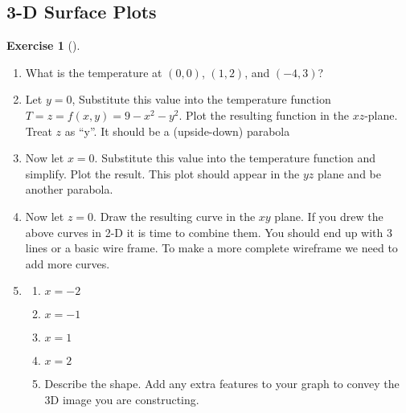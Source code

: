 \documentclass[10pt,]{book}
\theoremstyle{plain}
\theoremstyle{definition}
\theoremstyle{definition}
\theoremstyle{definition}
\theoremstyle{definition}
\newtheorem{exploration}[project]{Exercise}
\theoremstyle{definition}
\numberwithin{equation}{section}
\begin{document}
\subsection[{3-D Surface Plots}]{3-D Surface Plots}\label{subsection-22}
\begin{exploration}[]\label{prob_3dsurface_plot}
\leavevmode%
\begin{enumerate}[font=\bfseries,label=(\alph*),ref=\alph*]
\item\label{task-203} What is the temperature at \((0,0)\), \((1,2)\), and \((-4,3)\)?  %
\item\label{task-204} Let \(y=0\), Substitute this value into the temperature function \(T=z=f(x,y)=9-x^2-y^2\). Plot the resulting function in the \(xz\)-plane. Treat \(z\) as ``y''. It should be a (upside-down) parabola%
%
\item\label{task-205} Now let \(x=0\). Substitute this value into the temperature function and simplify. Plot the result. This plot should appear in the \(yz\) plane and be another parabola.%
\item\label{task-206} Now let \(z=0\). Draw the resulting curve in the \(xy\) plane. If you drew the above curves in 2-D it is time to combine them. You should end up with 3 lines or a basic wire frame. To make a more complete wireframe we need to add more curves.%
\item\label{task-207} \begin{enumerate}[font=\bfseries,label=(\roman*),ref=\theenumi.\roman*]
\item\label{task-208} \(x=-2\)%
\item\label{task-209} \(x=-1\)%
\item\label{task-210} \(x=1\)%
\item\label{task-211} \(x=2\)%
\item\label{task-212} Describe the shape. Add any extra features to your graph to convey the 3D image you are constructing.  %
\end{enumerate}
\end{enumerate}
\end{exploration}
\typeout{************************************************}
\typeout{************************************************}
\end{document}
